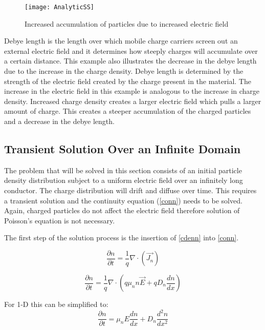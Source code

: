 \begin{doublespace}
\begin{figure}[!htp]
\centering
\texttt{[image: AnalyticSS]}
\caption{Increased accumulation of particles due to increased electric field} 
\end{figure}

Debye length is the length over which mobile charge carriers screen out an external electric field and it determines how steeply charges will accumulate over a certain distance. This example also illustrates the decrease in the debye length due to the increase in the charge density. Debye length is determined by the strength of the electric field created by the charge present in the material. The increase in the electric field in this example is analogous to the increase in charge density. Increased charge density creates a larger electric field which pulls a larger amount of charge. This creates a steeper accumulation of the charged particles and a decrease in the debye length. 

\clearpage
\subsection{Transient Solution Over an Infinite Domain}

The problem that will be solved in this section consists of an initial particle density distribution subject to a uniform electric field over an infinitely long conductor. The charge distribution will drift and diffuse over time. This requires a transient solution and the continuity equation (\ref{conn}) needs to be solved. Again, charged particles do not affect the electric field therefore solution of Poisson's equation is not necessary. 

The first step of the solution process is the insertion of \eqref{cdenn} into \eqref{conn}.

\begin{equation}
\frac{\partial n}{\partial t} = \frac{1}{q}\nabla \cdot (\vec{J_n})
\end{equation}


\begin{equation}
\frac{\partial n}{\partial t} = \frac{1}{q}\nabla \cdot (q \mu_{n} n \vec{E}+qD_{n} \frac{dn}{dx} )
\end{equation}

For 1-D this can be simplified to:
\begin{equation}
\frac{\partial n}{\partial t} = \mu_n E \frac{d n}{d x}+D_{n}\frac{d^{2}n}{dx^{2}}
\label{adifg}
\end{equation}


\end{doublespace}
